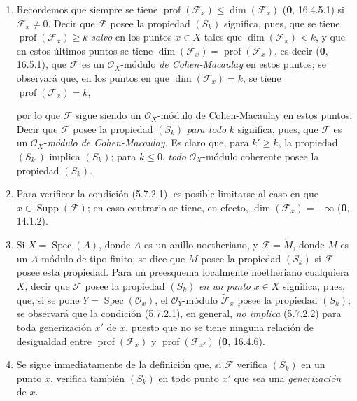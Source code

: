 \begin{remarks}[5.7.3]
\label{IV.2.s5.7.3-fr}
\begin{enumerate}
\item[(i)] Recordemos que siempre se tiene
$\operatorname{prof}(\mathscr F_x)\leq\dim(\mathscr F_x)$ (\textbf 0, 16.4.5.1)
si $\mathscr F_x\neq0$. Decir que $\mathscr F$ posee la propiedad $(S_k)$
significa, pues, que se tiene $\operatorname{prof}(\mathscr F_x)\geq k$ \emph{salvo}
en los puntos $x\in X$ tales que $\dim(\mathscr F_x)<k$, y que en estos
últimos puntos se tiene
$\dim(\mathscr F_x)=\operatorname{prof}(\mathscr F_x)$, es decir
(\textbf 0, 16.5.1), que $\mathscr F$ es un $\mathcal O_X$-módulo \emph{de
Cohen-Macaulay} en estos puntos; se observará que, en los puntos en que
$\dim(\mathscr F_x)=k$, se tiene $\operatorname{prof}(\mathscr F_x)=k$,


por lo que $\mathscr F$ sigue siendo un $\mathcal O_X$-módulo de
Cohen-Macaulay en estos puntos. Decir que $\mathscr F$ posee la propiedad
$(S_k)$ \emph{para todo} $k$ significa, pues, que $\mathscr F$ es un
$\mathcal O_X$-\emph{módulo de Cohen-Macaulay}. Es claro que, para $k'\geq k$, la
propiedad $(S_{k'})$ implica $(S_k)$; para $k\leq0$, \emph{todo}
$\mathcal O_X$-módulo coherente posee la propiedad $(S_k)$.

\item[(ii)] Para verificar la condición (5.7.2.1), es posible limitarse al caso
en que $x\in\operatorname{Supp}(\mathscr F)$; en caso contrario se tiene, en
efecto, $\dim(\mathscr F_x)=-\infty$ (\textbf 0, 14.1.2).

\item[(iii)] Si $X=\operatorname{Spec}(A)$, donde $A$ es un anillo
noetheriano, y $\mathscr F=\widetilde M$, donde $M$ es un $A$-módulo de tipo
finito, se dice que $M$ posee la propiedad $(S_k)$ si $\mathscr F$ posee esta
propiedad. Para un preesquema localmente noetheriano cualquiera $X$, decir que
$\mathscr F$ posee la propiedad $(S_k)$ \emph{en un punto} $x\in X$ significa, pues,
que, si se pone $Y=\operatorname{Spec}(\mathcal O_x)$, el
$\mathcal O_Y$-módulo $\widetilde{\mathscr F}_x$ posee la propiedad $(S_k)$;
se observará que la condición (5.7.2.1), en general, \emph{no implica} (5.7.2.2) para
toda generización $x'$ de $x$, puesto que no se tiene ninguna relación de
desigualdad entre $\operatorname{prof}(\mathscr F_x)$ y
$\operatorname{prof}(\mathscr F_{x'})$ (\textbf 0, 16.4.6).

\item[(iv)] Se sigue inmediatamente de la definición que, si $\mathscr F$
verifica $(S_k)$ en un punto $x$, verifica también $(S_k)$ en todo punto $x'$
que sea una \emph{generización} de $x$.


\end{enumerate}
\end{remarks}

